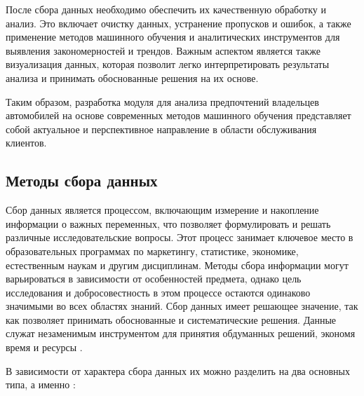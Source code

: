 После сбора данных необходимо обеспечить их качественную обработку и анализ. Это включает очистку данных, устранение пропусков и ошибок, а также применение методов машинного обучения и аналитических инструментов для выявления закономерностей и трендов. Важным аспектом является также визуализация данных, которая позволит легко интерпретировать результаты анализа и принимать обоснованные решения на их основе.

Таким образом, разработка модуля для анализа предпочтений владельцев автомобилей на основе современных методов машинного обучения представляет собой актуальное и перспективное направление в области обслуживания клиентов.




\subsection{Методы сбора данных}


Сбор данных является процессом, включающим измерение и накопление информации о важных переменных, что позволяет формулировать и решать различные исследовательские вопросы. Этот процесс занимает ключевое место в образовательных программах по маркетингу, статистике, экономике, естественным наукам и другим дисциплинам. Методы сбора информации могут варьироваться в зависимости от особенностей предмета, однако цель исследования и добросовестность в этом процессе остаются одинаково значимыми во всех областях знаний. Сбор данных имеет решающее значение, так как позволяет принимать обоснованные и систематические решения. Данные служат незаменимым инструментом для принятия обдуманных решений, экономя время и ресурсы .

В зависимости от характера сбора данных их можно разделить на два основных типа, а именно :

